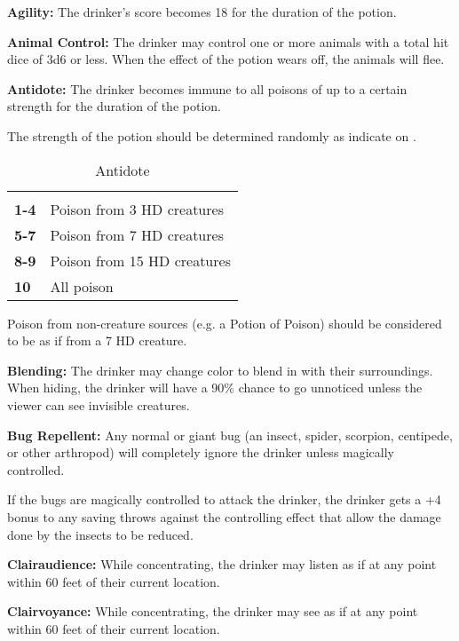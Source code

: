 \begin{multicols*}{2}
\textbf{Agility:} The drinker’s  score becomes 18 for the duration of the potion.

\textbf{Animal Control:} The drinker may control one or more animals with a total hit dice of 3d6 or less. When the effect of the potion wears off, the animals will flee.

\textbf{Antidote:} The drinker becomes immune to all poisons of up to a certain strength for the duration of the potion.

The strength of the potion should be determined randomly as indicate on .

\begin {table}[H]
	\caption{Antidote}\label{tab:Antidote}
  \begin{tabularx}{\columnwidth}{>{\bfseries}YY}
	 & \\
	1-4 & Poison from 3 HD creatures\\
	5-7 & Poison from 7 HD creatures\\
	8-9 & Poison from 15 HD creatures\\
	10 & All poison
  \end {tabularx}
\end {table}

Poison from non-creature sources (e.g. a Potion of Poison) should be considered to be as if from a 7 HD creature.

\textbf{Blending:} The drinker may change color to blend in with their surroundings. When hiding, the drinker will have a 90\% chance to go unnoticed unless the viewer can see invisible creatures.

\textbf{Bug Repellent:} Any normal or giant bug (an insect, spider, scorpion, centipede, or other arthropod) will completely ignore the drinker unless magically controlled.

If the bugs are magically controlled to attack the drinker, the drinker gets a +4 bonus to any saving throws against the controlling effect that allow the damage done by the insects to be reduced.

\textbf{Clairaudience:} While concentrating, the drinker may listen as if at any point within 60 feet of their current location.

\textbf{Clairvoyance:} While concentrating, the drinker may see as if at any point within 60 feet of their current location.


\end{multicols*}
